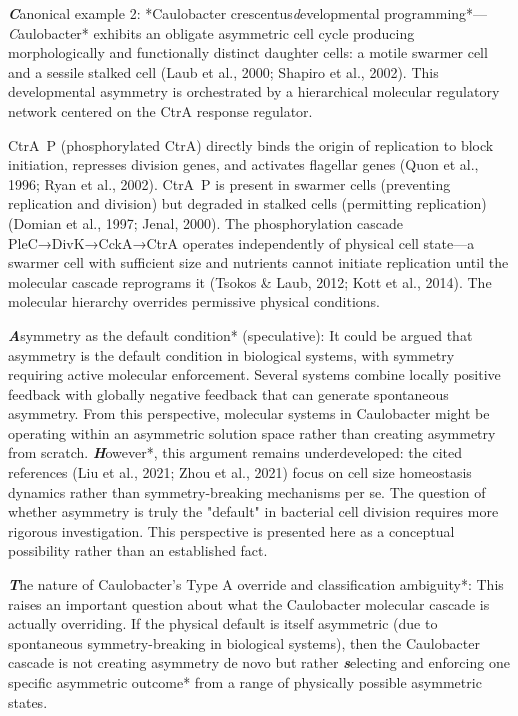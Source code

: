 \documentclass[11pt,a4paper]{article}
\begin{document}
\textbf\textit*Canonical example 2: *Caulobacter crescentus\textit* developmental programming*—\textit*Caulobacter* exhibits an obligate asymmetric cell cycle producing morphologically and functionally distinct daughter cells: a motile swarmer cell and a sessile stalked cell (Laub et al., 2000; Shapiro et al., 2002). This developmental asymmetry is orchestrated by a hierarchical molecular regulatory network centered on the CtrA response regulator.

CtrA~P (phosphorylated CtrA) directly binds the origin of replication to block initiation, represses division genes, and activates flagellar genes (Quon et al., 1996; Ryan et al., 2002). CtrA~P is present in swarmer cells (preventing replication and division) but degraded in stalked cells (permitting replication) (Domian et al., 1997; Jenal, 2000). The phosphorylation cascade PleC→DivK→CckA→CtrA operates independently of physical cell state—a swarmer cell with sufficient size and nutrients cannot initiate replication until the molecular cascade reprograms it (Tsokos & Laub, 2012; Kott et al., 2014). The molecular hierarchy overrides permissive physical conditions.

\textbf\textit*Asymmetry as the default condition* (speculative): It could be argued that asymmetry is the default condition in biological systems, with symmetry requiring active molecular enforcement. Several systems combine locally positive feedback with globally negative feedback that can generate spontaneous asymmetry. From this perspective, molecular systems in Caulobacter might be operating within an asymmetric solution space rather than creating asymmetry from scratch. \textbf\textit*However*, this argument remains underdeveloped: the cited references (Liu et al., 2021; Zhou et al., 2021) focus on cell size homeostasis dynamics rather than symmetry-breaking mechanisms per se. The question of whether asymmetry is truly the "default" in bacterial cell division requires more rigorous investigation. This perspective is presented here as a conceptual possibility rather than an established fact.

\textbf\textit*The nature of Caulobacter's Type A override and classification ambiguity*: This raises an important question about what the Caulobacter molecular cascade is actually overriding. If the physical default is itself asymmetric (due to spontaneous symmetry-breaking in biological systems), then the Caulobacter cascade is not creating asymmetry de novo but rather \textbf\textit*selecting and enforcing one specific asymmetric outcome* from a range of physically possible asymmetric states.
\end{document}
